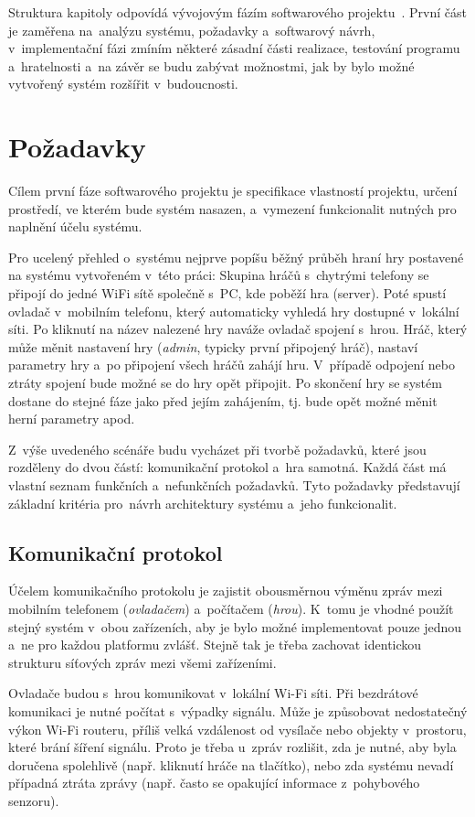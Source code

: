 \documentclass[thesis=B,czech,hidelinks]{FITthesis}[2012/06/26] %
\begin{document}
Struktura kapitoly odpovídá vývojovým fázím softwarového projektu~\cite{si}. První část je zaměřena na~analýzu systému, požadavky a~softwarový návrh, v~implementační fázi zmíním některé zásadní části realizace, testování programu a~hratelnosti a~na závěr se budu zabývat možnostmi, jak by bylo možné vytvořený systém rozšířit v~budoucnosti.

\section{Požadavky}
\label{section:requirements}

Cílem první fáze softwarového projektu je specifikace vlastností projektu, určení prostředí, ve kterém bude systém nasazen, a~vymezení funkcionalit nutných pro naplnění účelu systému.

Pro ucelený přehled o~systému nejprve popíšu běžný průběh hraní hry postavené na systému vytvořeném v~této práci: Skupina hráčů s~chytrými telefony se připojí do jedné WiFi sítě společně s~PC, kde poběží hra (server). Poté spustí ovladač v~mobilním telefonu, který automaticky vyhledá hry dostupné v~lokální síti. Po kliknutí na název nalezené hry naváže ovladač spojení s~hrou. Hráč, který může měnit nastavení hry (\textit{admin}, typicky první připojený hráč), nastaví parametry hry a~po připojení všech hráčů zahájí hru. V~případě odpojení nebo ztráty spojení bude možné se do hry opět připojit. Po skončení hry se systém dostane do stejné fáze jako před jejím zahájením, tj. bude opět možné měnit herní parametry apod.

Z~výše uvedeného scénáře budu vycházet při tvorbě požadavků, které jsou rozděleny do dvou částí: komunikační protokol a~hra samotná. Každá část má vlastní seznam funkčních a~nefunkčních požadavků. Tyto požadavky představují základní kritéria pro~návrh architektury systému a~jeho funkcionalit.

\subsection{Komunikační protokol}

Účelem komunikačního protokolu je zajistit obousměrnou výměnu zpráv mezi mobilním telefonem (\textit{ovladačem}) a~počítačem (\textit{hrou}). K~tomu je vhodné použít stejný systém v~obou zařízeních, aby je bylo možné implementovat pouze jednou a~ne pro každou platformu zvlášť. Stejně tak je třeba zachovat identickou strukturu síťových zpráv mezi všemi zařízeními.

Ovladače budou s~hrou komunikovat v~lokální Wi-Fi síti. Při bezdrátové komunikaci je nutné počítat s~výpadky signálu. Může je způsobovat nedostatečný výkon Wi-Fi routeru, příliš velká vzdálenost od vysílače nebo objekty v~prostoru, které brání šíření signálu. Proto je třeba u~zpráv rozlišit, zda je nutné, aby byla doručena spolehlivě (např. kliknutí hráče na tlačítko), nebo zda systému nevadí případná ztráta zprávy (např. často se opakující informace z~pohybového senzoru). 
\end{document}

